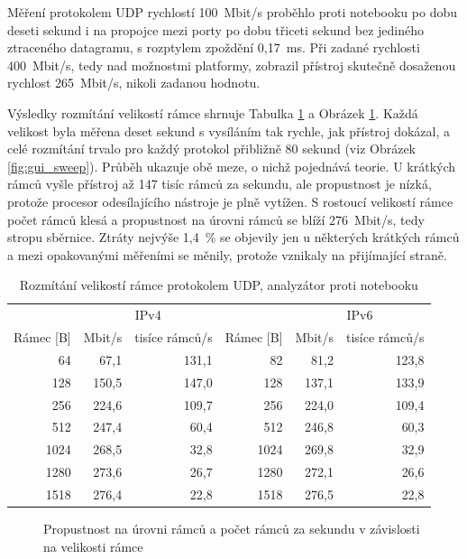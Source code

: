 Měření protokolem UDP rychlostí 100~Mbit/s proběhlo proti notebooku po dobu deseti sekund i na propojce mezi porty po dobu třiceti sekund bez jediného ztraceného datagramu, s rozptylem zpoždění 0,17~ms. Při zadané rychlosti 400~Mbit/s, tedy nad možnostmi platformy, zobrazil přístroj skutečně dosaženou rychlost 265~Mbit/s, nikoli zadanou hodnotu.

Výsledky rozmítání velikostí rámce shrnuje Tabulka \ref{tab:rozmitani} a Obrázek \ref{fig:graf_rozmitani}. Každá velikost byla měřena deset sekund s vysíláním tak rychle, jak přístroj dokázal, a celé rozmítání trvalo pro každý protokol přibližně 80 sekund (viz Obrázek \ref{fig:gui_sweep}). Průběh ukazuje obě meze, o nichž pojednává teorie. U krátkých rámců vyšle přístroj až 147 tisíc rámců za sekundu, ale propustnost je nízká, protože procesor odesílajícího nástroje je plně vytížen. S rostoucí velikostí rámce počet rámců klesá a propustnost na úrovni rámců se blíží 276~Mbit/s, tedy stropu sběrnice. Ztráty nejvýše 1,4~\% se objevily jen u některých krátkých rámců a mezi opakovanými měřeními se měnily, protože vznikaly na přijímající straně.

\begin{table}[htbp]
    \caption{Rozmítání velikostí rámce protokolem UDP, analyzátor proti notebooku}
    \label{tab:rozmitani}
    \centering
    \begin{tabular}{rrrrrr}
        \hline
        & \multicolumn{2}{c}{IPv4} & & \multicolumn{2}{c}{IPv6} \\
        Rámec [B] & Mbit/s & tisíce rámců/s & Rámec [B] & Mbit/s & tisíce rámců/s \\
        \hline
        64 & 67,1 & 131,1 & 82 & 81,2 & 123,8 \\
        128 & 150,5 & 147,0 & 128 & 137,1 & 133,9 \\
        256 & 224,6 & 109,7 & 256 & 224,0 & 109,4 \\
        512 & 247,4 & 60,4 & 512 & 246,8 & 60,3 \\
        1024 & 268,5 & 32,8 & 1024 & 269,8 & 32,9 \\
        1280 & 273,6 & 26,7 & 1280 & 272,1 & 26,6 \\
        1518 & 276,4 & 22,8 & 1518 & 276,5 & 22,8 \\
        \hline
    \end{tabular}
\end{table}

\begin{figure}[htbp]
    \centering
    
    \caption[Propustnost a počet rámců za sekundu podle velikosti rámce]{Propustnost na úrovni rámců a počet rámců za sekundu v závislosti na velikosti rámce}
    \label{fig:graf_rozmitani}
\end{figure}

